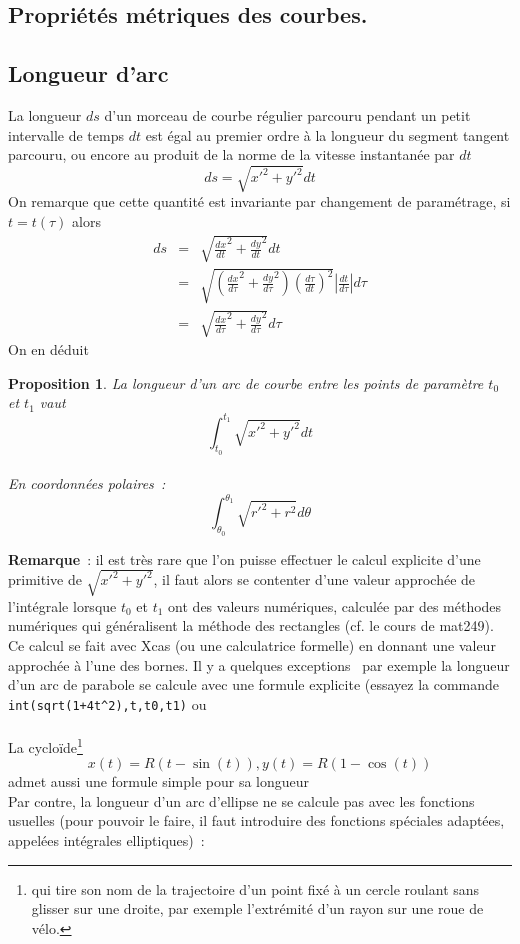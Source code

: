 \documentclass[a4paper,11pt]{article}
\newtheorem{prop}[thm]{Proposition}
\begin{document}
\begin{giacjshere}
\section{Propri\'et\'es m\'etriques des courbes.} \label{sec:courbes_m}
\subsection{Longueur d'arc}
La longueur $ds$ d'un morceau de courbe r\'egulier parcouru
pendant un petit intervalle de temps $dt$ est égal
au premier ordre à la longueur du segment tangent parcouru,
ou encore au produit de la norme de la vitesse instantanée 
par $dt$
$$ ds=\sqrt{x'^2+y'^2} dt$$
On remarque que cette quantit\'e est invariante par changement de 
param\'etrage, si $t=t(\tau)$ alors
\begin{eqnarray*} 
ds &= & \sqrt{\frac{dx}{dt}^2+\frac{dy}{dt}^2} dt \\
&=& \sqrt{ \left(\frac{dx}{d\tau}^2+\frac{dy}{d\tau}^2\right) 
\left(\frac{d\tau}{dt}\right)^2} |\frac{dt}{d\tau}| d\tau \\
& = & \sqrt{ \frac{dx}{d\tau}^2+\frac{dy}{d\tau}^2} d\tau
\end{eqnarray*}
On en déduit
\begin{prop} 
La longueur d'un arc de courbe entre les points
de paramètre $t_0$ et $t_1$ vaut
$$ \int_{t_0}^{t_1} \sqrt{x'^2+y'^2} dt$$\\
En coordonn\'ees polaires~:
$$ \int_{\theta_0}^{\theta_1} \sqrt{r'^2+r^2} d\theta$$
\end{prop}

{\bf Remarque}~: il est très rare que l'on puisse effectuer
le calcul explicite d'une primitive de $\sqrt{x'^2+y'^2}$,
il faut alors se contenter d'une valeur approchée de l'intégrale
lorsque $t_0$ et $t_1$ ont des valeurs numériques, calculée
par des méthodes numériques qui généralisent la méthode
des rectangles (cf. le cours de mat249).
Ce calcul se fait avec Xcas (ou une calculatrice formelle) en donnant
une valeur approchée à l'une des bornes.
Il y a quelques exceptions~ par exemple la longueur d'un arc de 
parabole se calcule avec une formule explicite (essayez la
commande \verb|int(sqrt(1+4t^2),t,t0,t1)| ou\\
\\
La cyclo\"ide\footnote{qui tire
son nom de la trajectoire d'un point fix\'e \`a un cercle roulant
sans glisser sur une droite, par exemple l'extr\'emit\'e d'un rayon 
sur une roue de v\'elo.} 
$$ x(t)=R(t-\sin(t)), y(t)=R(1-\cos(t))$$
admet aussi une formule simple pour sa longueur 
\\
Par contre, la
longueur d'un arc d'ellipse ne se calcule pas avec les fonctions
usuelles (pour pouvoir le faire, il faut introduire des fonctions spéciales
adaptées, appel\'ees int\'egrales elliptiques)~:\\



\end{giacjshere}
\end{document}
